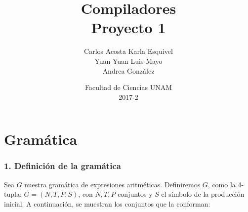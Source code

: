 \documentclass[12pt]{article}
\title{Compiladores\\ Proyecto 1}
\author{Carlos Acosta \qquad Karla Esquivel \\ Yuan Yuan \qquad Luis Mayo \\ Andrea González}
\date{Facultad de Ciencias UNAM \\ 2017-2}
\begin{document}
\maketitle
\section*{Gramática}
\subsubsection*{1. Definición de la gramática}

Sea $G$ nuestra gramática de expresiones aritméticas. Definiremos $G$, como la 4-tupla: $G = (N,T,P,S)$, con $N,T,P$ conjuntos y $S$ el símbolo de la producción inicial.
A continuación, se muestran los conjuntos que la conforman:\\
\end{document}
